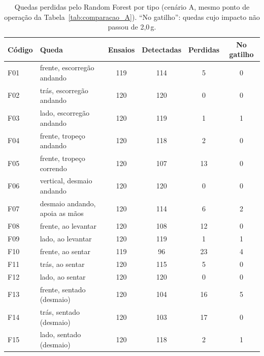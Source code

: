 \begin{table}[H]
\centering
\caption{Quedas perdidas pelo Random Forest por tipo (cenário A, mesmo ponto de operação da Tabela~\ref{tab:comparacao_A}). ``No gatilho'': quedas cujo impacto não passou de 2,0\,g.}
\label{tab:erros_quedas}
\small
\setlength{\tabcolsep}{4pt}
\begin{tabular}{@{}llcccc@{}}
\toprule
Código & Queda & Ensaios & Detectadas & Perdidas & No gatilho \\
\midrule
F01 & frente, escorregão andando & 119 & 114 & 5 & 0 \\
F02 & trás, escorregão andando & 120 & 120 & 0 & 0 \\
F03 & lado, escorregão andando & 120 & 119 & 1 & 1 \\
F04 & frente, tropeço andando & 120 & 118 & 2 & 0 \\
F05 & frente, tropeço correndo & 120 & 107 & 13 & 0 \\
F06 & vertical, desmaio andando & 120 & 120 & 0 & 0 \\
F07 & desmaio andando, apoia as mãos & 120 & 114 & 6 & 2 \\
F08 & frente, ao levantar & 120 & 108 & 12 & 0 \\
F09 & lado, ao levantar & 120 & 119 & 1 & 1 \\
F10 & frente, ao sentar & 119 & 96 & 23 & 4 \\
F11 & trás, ao sentar & 120 & 115 & 5 & 0 \\
F12 & lado, ao sentar & 120 & 120 & 0 & 0 \\
F13 & frente, sentado (desmaio) & 120 & 104 & 16 & 5 \\
F14 & trás, sentado (desmaio) & 120 & 103 & 17 & 0 \\
F15 & lado, sentado (desmaio) & 120 & 118 & 2 & 1 \\
\bottomrule
\end{tabular}
\end{table}
